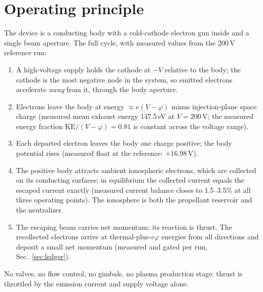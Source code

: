 \documentclass[11pt]{article}
\begin{document}
\section{Operating principle}
\label{sec:principle}
The device is a conducting body with a cold-cathode electron gun inside and a
single beam aperture. The full cycle, with measured values from the 200\,V
reference run:
\begin{enumerate}
  \item A high-voltage supply holds the cathode at $-V$ relative to the body;
        the cathode is the most negative node in the system, so emitted
        electrons accelerate \emph{away} from it, through the body aperture.
  \item Electrons leave the body at energy $\approx e(V-\varphi)$ minus
        injection-plane space charge (measured mean exhaust energy
        147.5\,eV at $V = 200$\,V; the measured energy fraction
        $\mathrm{KE}/(V-\varphi) = 0.81$ is constant across the voltage
        range).
  \item Each departed electron leaves the body one charge positive; the body
        potential rises (measured float at the reference: $+16.98$\,V).
  \item The positive body attracts ambient ionospheric electrons, which are
        collected on its conducting surfaces; in equilibrium the collected
        current equals the escaped current exactly (measured current balance
        closes to 1.5--3.5\% at all three operating points). The ionosphere
        is both the propellant reservoir and the neutralizer.
  \item The escaping beam carries net momentum; its reaction is thrust. The
        recollected electrons arrive at thermal-plus-$e\varphi$ energies from
        all directions and deposit a small net momentum (measured and gated
        per run, Sec.~\ref{sec:ledger}).
\end{enumerate}
No valves, no flow control, no gimbals, no plasma production stage: thrust is
throttled by the emission current and supply voltage alone.
\end{document}
